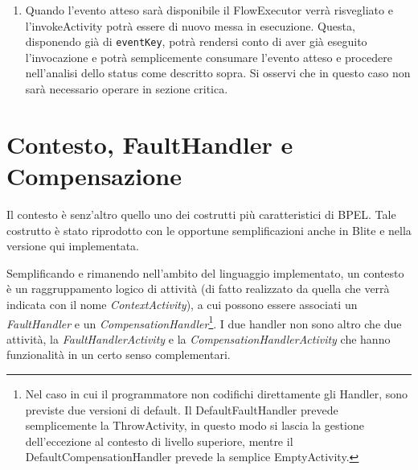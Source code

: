 \begin{enumerate}
  \item Quando l'evento atteso sarà disponibile il FlowExecutor verrà
  risvegliato e l'invokeActivity potrà essere di nuovo messa in esecuzione.
  Questa, disponendo già di \texttt{eventKey}, potrà rendersi conto di aver
  già eseguito l'invocazione e potrà semplicemente consumare l'evento
  atteso e procedere nell'analisi dello status come descritto sopra. Si
  osservi che in questo caso non sarà necessario operare in sezione critica.
\end{enumerate}

\section{Contesto, FaultHandler e Compensazione}

Il contesto è senz'altro quello uno dei costrutti più caratteristici di BPEL.
Tale costrutto \`e stato riprodotto con le opportune semplificazioni anche in
Blite e nella versione qui implementata.

Semplificando e rimanendo nell'ambito del linguaggio implementato, un
contesto \`e un raggruppamento logico di attività (di fatto realizzato da
quella che verrà indicata con il nome \emph{ContextActivity}), a cui possono
essere associati un \emph{FaultHandler} e un \emph{CompensationHandler}\footnote{Nel
caso in cui il programmatore non codifichi direttamente gli Handler, sono
previste due versioni di default. Il DefaultFaultHandler prevede
semplicemente la ThrowActivity, in questo modo si lascia la gestione
dell'eccezione al contesto di livello superiore, mentre il
DefaultCompensationHandler prevede la semplice EmptyActivity.}. I due handler
non sono altro che due attività, la \emph{FaultHandlerActivity} e la \emph{CompensationHandlerActivity} che hanno funzionalità in un certo senso complementari.

